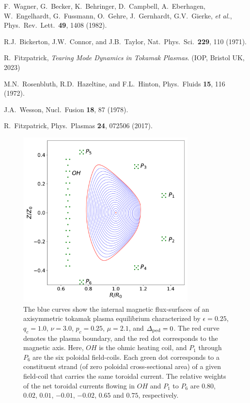 \documentclass[12pt,prb,aps]{revtex4-1}
\begin{document}
\begin{thebibliography}{99}
 F.~Wagner, G.~Becker, K.~Behringer, D.~Campbell, A.~Eberhagen, W.~Engelhardt, G.~Fussmann, O.~Gehre, J.~Gernhardt, 
G.V.~Gierke, {\em  et al.}, Phys.\ Rev.\ Lett.\ {\bf 49}, 1408 (1982).

 R.J.~Bickerton, J.W.~Connor, and J.B.~Taylor, Nat.\ Phys.\ Sci.\ {\bf 229}, 110 (1971).

 R.~Fitzpatrick, {\em Tearing Mode Dynamics in Tokamak Plasmas}. (IOP, Bristol UK,  2023)

 M.N.~Rosenbluth, R.D.~Hazeltine, and F.L.~Hinton, Phys.\ Fluids {\bf 15}, 116 (1972).

 J.A.~Wesson, Nucl.\ Fusion {\bf 18}, 87 (1978). 

 R.~Fitzpatrick, Phys.\ Plasmas {\bf 24}, 072506 (2017).

\end{thebibliography}

\newpage

\begin{figure}
\centerline{\includegraphics[width=0.8\textwidth]{Figure1.pdf}}
\caption{The blue curves show the internal magnetic flux-surfaces of an axisymmetric tokamak plasma equilibrium characterized by $\epsilon=0.25$, $q_c=1.0$, $\nu=3.0$, $p_c=0.25$, $\mu=2.1$, and ${\mit\Delta}_{\rm ped}=0$. 
The red curve denotes the plasma boundary, and the red dot corresponds to the magnetic axis. 
 Here, $OH$ is the ohmic heating coil, and $P_1$ through $P_6$ are the six poloidal field-coils.  Each green dot corresponds to a constituent strand (of zero poloidal cross-sectional area) of a given field-coil that carries the same toroidal current.
 The relative weights of the net toroidal currents flowing in $OH$ and $P_1$ to $P_6$ are $0.80$, $0.02$, $0.01$, $-0.01$, $-0.02$, $0.65$ and $0.75$, respectively.}\label{fig1}
\end{figure}
\end{document}
